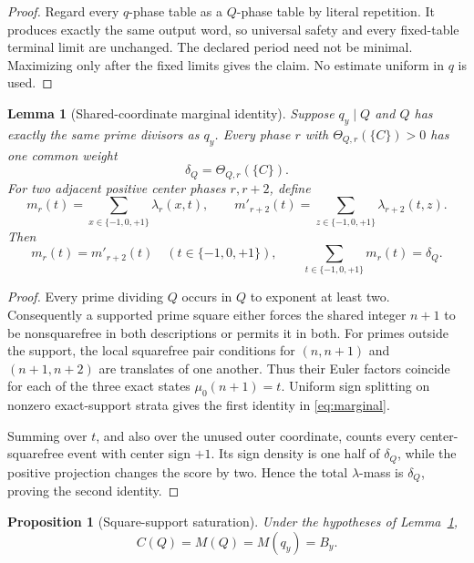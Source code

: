 \documentclass[11pt]{article}
\newtheorem{proposition}[theorem]{Proposition}
\newtheorem{lemma}[theorem]{Lemma}
\theoremstyle{definition}
\theoremstyle{remark}
\newcommand{\mob}{\mu}
\newcommand{\T}{\{-1,0,+1\}}
\begin{document}
{\begin{proof}
Regard every \(q\)-phase table as a \(Q\)-phase table by literal
repetition.  It produces exactly the same output word, so universal safety
and every fixed-table terminal limit are unchanged.  The declared period
need not be minimal.  Maximizing only after the fixed limits gives the
claim.  No estimate uniform in \(q\) is used.
\end{proof}

\begin{lemma}[Shared-coordinate marginal identity]
\label{lem:marginal}
Suppose \(q_y\mid Q\) and \(Q\) has exactly the same prime divisors as
\(q_y\).  Every phase \(r\) with
\(\Theta_{Q,r}(\{C\})>0\) has one common weight
\[
 \delta_Q=\Theta_{Q,r}(\{C\}).
\]
For two adjacent positive center phases \(r,r+2\), define
\[
 m_r(t)=\sum_{x\in\T}\lambda_r(x,t),\qquad
 m'_{r+2}(t)=\sum_{z\in\T}\lambda_{r+2}(t,z).
\]
Then
\begin{equation}
 m_r(t)=m'_{r+2}(t)\quad(t\in\T),\qquad
 \sum_{t\in\T}m_r(t)=\delta_Q.
 \label{eq:marginal}
\end{equation}
\end{lemma}

\begin{proof}
Every prime dividing \(Q\) occurs in \(Q\) to exponent at least two.
Consequently a supported prime square either forces the shared integer
\(n+1\) to be nonsquarefree in both descriptions or permits it in both.
For primes outside the support, the local squarefree pair conditions for
\((n,n+1)\) and \((n+1,n+2)\) are translates of one another.  Thus their
Euler factors coincide for each of the three exact states
\(\mob_0(n+1)=t\).  Uniform sign splitting on nonzero exact-support strata
gives the first identity in \eqref{eq:marginal}.

Summing over \(t\), and also over the unused outer coordinate, counts every
center-squarefree event with center sign \(+1\).  Its sign density is one
half of \(\delta_Q\), while the positive projection changes the score by
two.  Hence the total \(\lambda\)-mass is \(\delta_Q\), proving the second
identity.
\end{proof}

\begin{proposition}[Square-support saturation]
\label{prop:square-saturation}
Under the hypotheses of Lemma~\ref{lem:marginal},
\begin{equation}
 \boxed{C(Q)=M(Q)=M(q_y)=B_y.}
 \label{eq:centered-saturation}
\end{equation}
\end{proposition}

}
\end{document}
